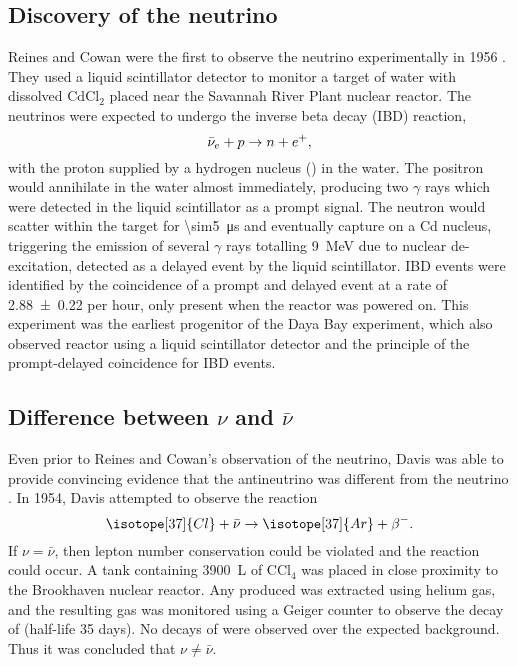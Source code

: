 \subsection{Discovery of the neutrino}
\label{subsec:discovery}

Reines and Cowan were the first to observe the neutrino experimentally in 1956
\cite{reines_cowan}.
They used a liquid scintillator detector to monitor a target of
water with dissolved $\text{CdCl}_2$
placed near the Savannah River Plant nuclear reactor.
The neutrinos were expected to undergo the inverse beta decay (IBD) reaction,
\begin{equation}\label{eq:ibd}
    \bar{\nu}_e + p \to n + e^+,
\end{equation}
with the proton supplied by a hydrogen nucleus () in the water.
The positron would annihilate in the water almost immediately,
producing two $\gamma$ rays which were detected in the liquid scintillator
as a prompt signal.
The neutron would scatter within the target for \SI{\sim5}{\us}
and eventually capture on a Cd nucleus,
triggering the emission of several $\gamma$ rays totalling \SI{9}{\MeV}
due to nuclear de-excitation,
detected as a delayed event by the liquid scintillator.
IBD events were identified by the coincidence of a prompt and delayed event
at a rate of \num{2.88\pm0.22} per hour,
only present when the reactor was powered on.
This experiment was the earliest progenitor of the Daya Bay experiment,
which also observed reactor \nuebar{} using a liquid scintillator detector
and the principle of the prompt-delayed coincidence for IBD events.

\subsection{Difference between \texorpdfstring{$\nu$ and $\bar{\nu}$}{nu and nu-bar}}
\label{subsec:nu_vs_nubar}

Even prior to Reines and Cowan's observation of the neutrino,
Davis was able to provide convincing evidence that
the antineutrino was different from the neutrino \cite{davis_diff_nuebar}.
In 1954, Davis attempted to observe the reaction
\begin{equation}\label{eq:davis_nubar}
    \isotope[37]{Cl} + \bar{\nu} \to \isotope[37]{Ar} + \beta^-.
\end{equation}
If $\nu=\bar{\nu}$, then lepton number conservation could be violated
and the reaction could occur.
A tank containing \SI{3900}{\liter} of $\text{CCl}_4$
was placed in close proximity to the Brookhaven nuclear reactor.
Any  produced was extracted using helium gas,
and the resulting gas was monitored using a Geiger counter
to observe the decay of  (half-life 35 days).
No decays of  were observed over the expected background.
Thus it was concluded that $\nu\neq\bar{\nu}$.

